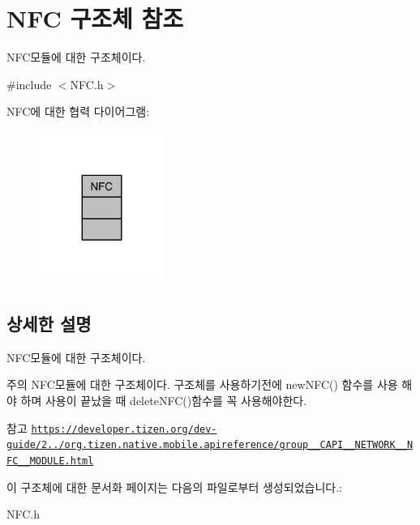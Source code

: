 \hypertarget{struct_n_f_c}{\section{N\-F\-C 구조체 참조}
\label{struct_n_f_c}
}


N\-F\-C모듈에 대한 구조체이다.  




{\ttfamily \#include $<$N\-F\-C.\-h$>$}



N\-F\-C에 대한 협력 다이어그램\-:\nopagebreak
\begin{figure}[H]
\begin{center}
\leavevmode
\includegraphics[width=116pt]{d2/d43/struct_n_f_c__coll__graph}
\end{center}
\end{figure}


\subsection{상세한 설명}
N\-F\-C모듈에 대한 구조체이다. 

\begin{DoxyNote}{주의}
N\-F\-C모듈에 대한 구조체이다. 구조체를 사용하기전에 new\-N\-F\-C() 함수를 사용 해야 하며 사용이 끝났을 때 delete\-N\-F\-C()함수를 꼭 사용해야한다. 
\end{DoxyNote}
\begin{DoxySeeAlso}{참고}
\href{https://developer.tizen.org/dev-guide/2.3.0/org.tizen.native.mobile.apireference/group__CAPI__NETWORK__NFC__MODULE.html}{\tt https\-://developer.\-tizen.\-org/dev-\/guide/2../org.\-tizen.\-native.\-mobile.\-apireference/group\-\_\-\-\_\-\-C\-A\-P\-I\-\_\-\-\_\-\-N\-E\-T\-W\-O\-R\-K\-\_\-\-\_\-\-N\-F\-C\-\_\-\-\_\-\-M\-O\-D\-U\-L\-E.\-html} 
\end{DoxySeeAlso}


이 구조체에 대한 문서화 페이지는 다음의 파일로부터 생성되었습니다.\-:\begin{DoxyCompactItemize}
\item 
N\-F\-C.\-h\end{DoxyCompactItemize}

